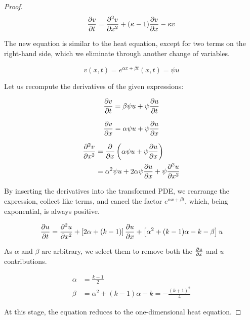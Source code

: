 \begin{proof}
    \begin{equation*}
        \pdv{v}{t} 
        = \pdv[2]{v}{x} 
        + (\kappa - 1)\pdv{v}{x} 
        - \kappa v
    \end{equation*}
    
    The new equation is similar to the heat equation, except for two terms on the right-hand side, which we eliminate through another change of variables.
    
    \begin{equation*}
        v(x,t) = e^{\alpha x + \beta t}(x,t) = \psi u
    \end{equation*}
    
    Let us recompute the derivatives of the given expressions:
    
    \begin{equation*}
        \pdv{v}{t} = \beta \psi u + \psi \pdv{u}{t}
    \end{equation*}

    \begin{equation*}
        \pdv{v}{x} = \alpha \psi u + \psi \pdv{u}{x}
    \end{equation*}
    
    \begin{align*}
        \pdv[2]{v}{x} &= \pdv{}{x} \left( \alpha \psi u + \psi \pdv{u}{x} \right) \\
         &= \alpha^2 \psi u + 2 \alpha \psi \pdv{u}{x} + \psi \pdv[2]{u}{x}
    \end{align*}

    By inserting the derivatives into the transformed PDE, we rearrange the expression, collect like terms, and cancel the factor $e^{\alpha x + \beta t}$, which, being exponential, is always positive.

    \begin{equation*}
        \pdv{u}{t} = \pdv[2]{u}{x} + \left[ 2\alpha + (k - 1) \right] \pdv{u}{x} + \left[ \alpha^2 + (k - 1)\alpha - k - \beta \right] u
    \end{equation*}

    As $\alpha$ and $\beta$ are arbitrary, we select them to remove both the $\pdv{u}{x}$ and $u$ contributions.

    \begin{align*}
        \alpha &= \frac{k - 1}{2} \\
        \beta  &= \alpha^2 + (k - 1)\alpha - k = -\frac{(k + 1)^2}{4}
    \end{align*}

    At this stage, the equation reduces to the one-dimensional heat equation.


\end{proof}
